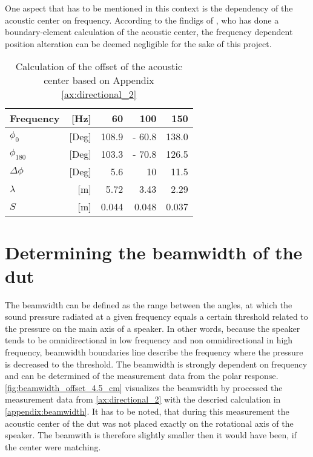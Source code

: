 One aspect that has to be mentioned in this context is the dependency of the acoustic center on frequency. According to the findigs of \citep{vanderkooy10}, who has done a boundary-element calculation of the acoustic center, the frequency dependent position alteration can be deemed  negligible for the sake of this project.
\begin{table}[H]
\centering
\caption{Calculation of the offset of the acoustic center based on Appendix \ref{ax:directional_2}}
\label{tab:shift_meas2}
\begin{tabular}{|lr|r|r|r|}
\hline
Frequency              & {[}Hz{]}  & 60    & 100    & 150   \\ \hline
\(\phi_0\)             & {[}Deg{]} & 108.9 & - 60.8 & 138.0 \\ \hline
\(\phi_{180}\)         & {[}Deg{]} & 103.3 & - 70.8 & 126.5 \\ \hline
\(\Delta\phi\)         & {[}Deg{]} & 5.6   & 10     & 11.5  \\ \hline
\(\lambda\)            & {[}m{]}   & 5.72  & 3.43   & 2.29  \\ \hline
\(S\)                  & {[}m{]}   & 0.044 & 0.048  & 0.037 \\ \hline
\end{tabular}
\end{table}


\section{Determining the beamwidth of the \gls{dut}}\label{sec:beamwidth}
The beamwidth can be defined as the range between the angles, at which the sound pressure radiated at a given frequency equals a certain threshold related to the pressure on the main axis of a speaker. In other words, because the speaker tends to be omnidirectional in low frequency and non omnidirectional in high frequency, beamwidth boundaries line describe the frequency where the pressure is decreased to the threshold. The beamwidth is strongly dependent on frequency and can be determined of the measurement data from the polar response. \autoref{fig:beamwidth_offset_4.5_cm} visualizes the beamwidth by processed the measurement data from \ref{ax:directional_2} with the descried calculation in \autoref{appendix:beamwidth}. It has to be noted, that during this measurement the acoustic center of the \gls{dut} was not placed exactly on the rotational axis of the speaker. The beamwith is therefore slightly smaller then it would have been, if the center were matching.

